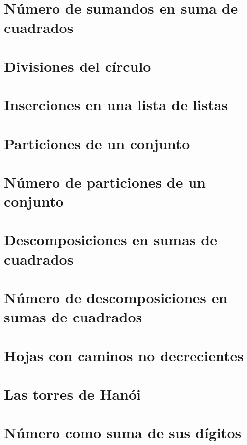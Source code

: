 \documentclass[a4paper,12pt,twoside]{book}
\begin{document}
\chapter{Número de sumandos en suma de cuadrados}
\label{190221}

\chapter{Divisiones del círculo}
\label{190222}


\chapter{Inserciones en una lista de listas}
\label{190225}

\chapter{Particiones de un conjunto}
\label{190226}

\chapter{Número de particiones de un conjunto}
\label{190227}

\chapter{Descomposiciones en sumas de cuadrados}
\label{190228}

\chapter{Número de descomposiciones en sumas de
  cuadrados}
\label{190301}


\chapter{Hojas con caminos no decrecientes}
\label{190304}

\chapter{Las torres de Hanói}
\label{190305}

\chapter{Número como suma de sus dígitos}
\label{190306}
\end{document}
